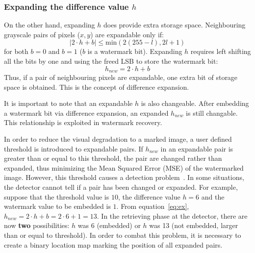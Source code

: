 \documentclass[10pt,twocolumn,letterpaper]{article}
\begin{document}
{\subsubsection{Expanding the difference value $h$}
\label{sec:ex}
On the other hand, expanding $h$ does provide extra storage space.
Neighbouring grayscale pairs of pixels ($x,y$) are expandable only if:
\begin{equation}
\label{eq:exFind}
\left | 2 \cdot h + b \right | \leq \mbox{min}(2(255-l),2l+1)
\end{equation}
for both $b=0$ and $b=1$ ($b$ is a watermark bit).
Expanding $h$ requires left shifting all the bits by one and using the
freed LSB to store the watermark bit:
\begin{equation}
\label{eq:ex}
h_{new} = 2 \cdot h + b
\end{equation}
Thus, if a pair of neighbouring pixels are expandable, one extra bit of storage
space is obtained. This is the concept of difference expansion.

It is important to note that an expandable $h$ is also changeable. After embedding
a watermark bit via difference expansion, an expanded $h_{new}$ is still changable.
This relationship is exploited in watermark recovery.

In order to reduce the visual degradation to a marked image, a user defined threshold is introduced to
expandable pairs. If $h_{new}$ in an expandable pair is greater than or equal to this threshold,
the pair are changed rather than expanded, thus minimizing the Mean Squared Error (MSE) of the watermarked image.
However, this threshold causes a detection problem~\cite{feng06}. In some situations, the 
detector cannot tell if a pair has been changed or expanded. For example, suppose that the threshold
value is $10$, the difference value $h = 6$ and the watermark 
value to be embedded is $1$. From equation~\ref{eq:ex}, $h_{new} = 2 \cdot h + b = 2 \cdot 6 + 1 = 13$. 
In the retrieving phase at the detector, there are now {\bf two} possibilities: $h$ was $6$ (embedded)
or $h$ was 13 (not embedded, larger than or equal to threshold). In order to combat this problem, it is necessary
to create a binary location map marking the position of all expanded pairs.

}
\end{document}
